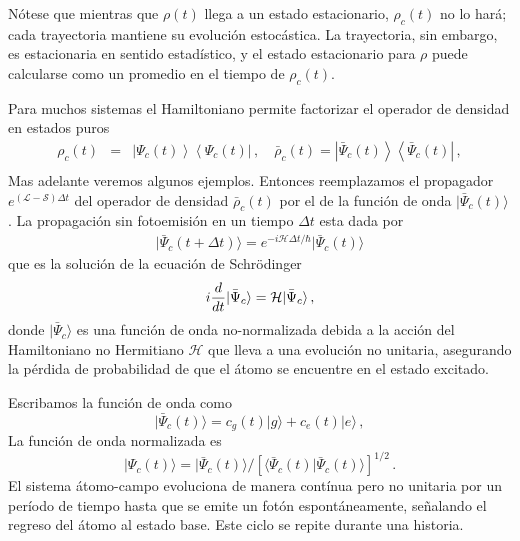 \documentclass[twocolumn,aps,eqsecnum,showkeys,amsmath]{revtex4}
\newcommand{\mcH}{\mathcal{H}} 	%
\newcommand{\mcL}{\mathcal{L}}
\newcommand{\mcS}{\mathcal{S}}
\providecommand{\ket}[1]{\lvert #1 \rangle}
\providecommand{\braket}[2]{\langle #1 \rvert #2 \rangle}
\newcommand{\ketbra}[2]{\left| {#1} \right\rangle\left\langle {#2}\right|}
\begin{document}
N\'otese que mientras que $\rho (t)$ llega a un  estado estacionario, $\rho_c (t)$ 
no lo har\'a; cada trayectoria mantiene su evoluci\'on estoc\'astica. La trayectoria, 
sin embargo, es estacionaria en sentido estad\'istico, y el estado estacionario 
para $\rho$ puede calcularse como un promedio en el tiempo de $\rho_c (t)$. 

Para muchos sistemas el Hamiltoniano permite factorizar el operador 
de densidad en estados puros
%
\begin{eqnarray}
\rho_c (t) &=& \ketbra{\Psi_c (t) }{ \Psi_c  (t)} 	\,, 	\quad 
	\bar{\rho}_c (t) = \ketbra{ \bar{\Psi}_c (t) }{ \bar{\Psi}_c  (t)} \,, 
	\nonumber \\ 
\end{eqnarray}
Mas adelante veremos algunos ejemplos. Entonces reemplazamos el propagador 
$e^{ (\mcL - \mcS) \Delta t}$ del operador de densidad $\bar{\rho}_c (t)$ por el de 
la funci\'on de onda $| \bar{\Psi}_c (t) \rangle$. La propagaci\'on sin fotoemisi\'on 
en un tiempo $\Delta t$ esta dada por 
%
\begin{eqnarray}
\ket{ \bar{\Psi}_c (t+ \Delta t) } 
	= e^{- i \mcH \Delta t /\hbar} \ket{ \bar{\Psi}_c (t) } 
\end{eqnarray}
que es la soluci\'on de la ecuaci\'on de Schr\"odinger 
%
\begin{eqnarray}
i \frac{d}{dt} \ket{ \bar{\Psi}_c } = {\cal H} \ket{ \bar{\Psi}_c } \,,
\end{eqnarray}
donde $\ket{ \bar{\Psi}_c }$ es una funci\'on de onda no-normalizada debida a la 
acci\'on del Hamiltoniano no Hermitiano $\mcH$ que lleva a una evoluci\'on 
no unitaria, asegurando la p\'erdida de probabilidad de que el \'atomo se encuentre 
en el estado excitado. 

Escribamos la funci\'on de onda como 
%
\begin{equation}
\ket{ \bar{\Psi}_c (t) } = c_g(t) \ket{g} +c_e(t) \ket{e} 	\,,
\end{equation}
La funci\'on de onda normalizada es 
$$\ket{ \Psi_c(t) } = \ket{ \bar{\Psi}_c(t) } / 
	[\braket{ \bar{\Psi}_c(t)}{ \bar{\Psi}_c(t)} ]^{1/2} \,.$$
El sistema \'atomo-campo evoluciona de manera cont\'inua pero no unitaria por un 
per\'iodo de tiempo hasta que se emite un fot\'on espont\'aneamente, se\~nalando 
el regreso del \'atomo al estado base. Este ciclo se repite durante una historia. 
\end{document}
